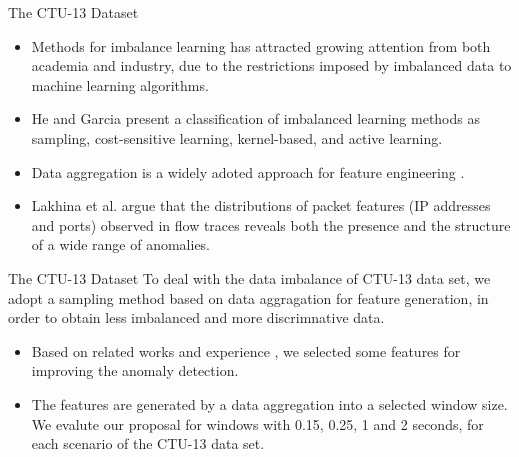 \documentclass[newPxFont, numfooter, sectionpages]{beamer}
\begin{document}
\begin{frame}[c]{The CTU-13 Dataset}
	\begin{itemize}
		\item Methods for imbalance learning has attracted growing attention from both academia and industry, due to the restrictions imposed by imbalanced data to machine learning algorithms.
		\item He and Garcia \cite{he2008learning} present a classification of imbalanced learning methods as sampling, cost-sensitive learning, kernel-based, and active learning.
		\item Data aggregation is a widely adoted approach for feature engineering \cite{chandrashekar2014survey,acarali2016survey}.
		\item Lakhina et al. \cite{lakhina2005mining} argue that the distributions of packet features (IP addresses and ports) observed in flow traces reveals both the presence and the structure of a wide range of anomalies.
	\end{itemize}
\end{frame}

\begin{frame}[c]{The CTU-13 Dataset}
	To deal with the data imbalance of CTU-13 data set, we adopt a sampling method based on data aggragation \cite{acarali2016survey} for feature generation, in order to obtain less imbalanced and more discrimnative data.	
	\begin{itemize}
		\item Based on related works \cite{lakhina2005mining,chandrashekar2014survey,acarali2016survey} and experience \cite{vieira2017model, galibus2017offline}, we selected some features for improving the anomaly detection.
		\item The features are generated by a data aggregation into a selected window size. We evalute our proposal for windows with 0.15, 0.25, 1 and 2 seconds, for each scenario of the CTU-13 data set.
	\end{itemize}
\end{frame}
\end{document}

